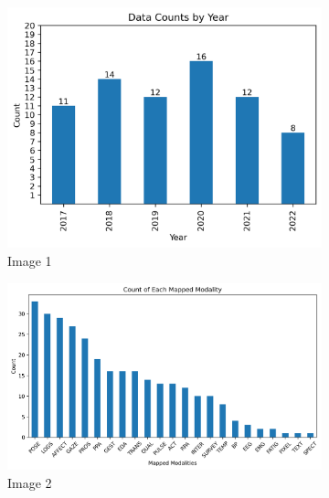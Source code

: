\documentclass[manuscript,screen,review]{acmart}
\begin{document}
\begin{figure}[h!]
    \centering
    \begin{subfigure}[b]{0.45\textwidth}
        \includegraphics[width=\textwidth]{img/statistical_imgs/year.png}
        \caption{Image 1}
    \end{subfigure}
    \hfill
    \begin{subfigure}[b]{0.45\textwidth}
        \includegraphics[width=\textwidth]{img/statistical_imgs/modalities.png}
        \caption{Image 2}
    \end{subfigure}
    \hfill
    \begin{subfigure}[b]{0.45\textwidth}

\end{subfigure}
\end{figure}
\end{document}
